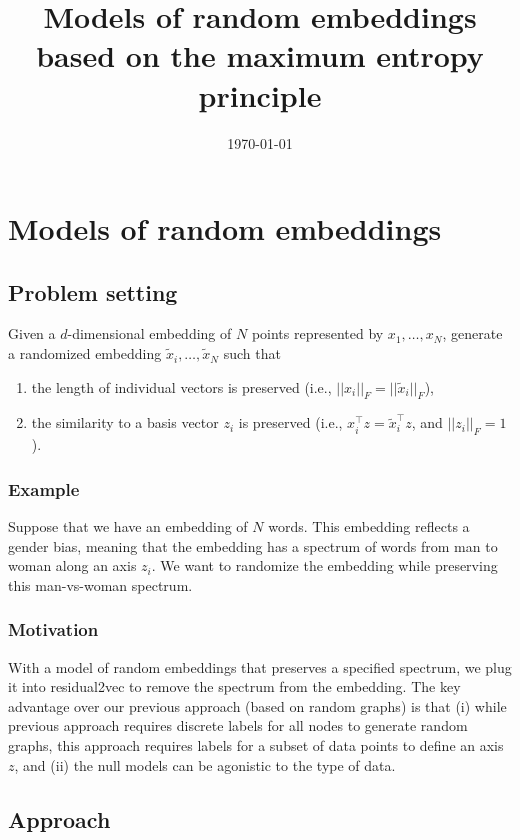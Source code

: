 \documentclass[12pt]{article} %
\begin{document}

\title{Models of random embeddings based on the maximum entropy principle} %
\date{\today}
\maketitle %

\section{Models of random embeddings}
\subsection{Problem setting}

Given a $d$-dimensional embedding of $N$ points represented by $x_1, \ldots, x_N$, generate a randomized embedding $\tilde x_i, \ldots, \tilde x_N$ such that
\begin{enumerate}
\item the length of individual vectors is preserved (i.e., $||x_i||_F = ||\tilde x_i||_F$),
\item the similarity to a basis vector $z_i$ is preserved (i.e., $x_i ^\top z = \tilde x_i ^\top z$, and $||z_i||_F = 1$).
\end{enumerate}

\subsubsection*{Example}
Suppose that we have an embedding of $N$ words. This embedding reflects a gender bias, meaning that the embedding has a spectrum of words from man to woman along an axis $z_i$. We want to randomize the embedding while preserving this man-vs-woman spectrum.

\subsubsection*{Motivation}
With a model of random embeddings that preserves a specified spectrum, we plug it into residual2vec to remove the spectrum from the embedding. The key advantage over our previous approach (based on random graphs) is that (i) while previous approach requires discrete labels for all nodes to generate random graphs, this approach requires labels for a subset of data points to define an axis $z$, and (ii) the null models can be agonistic to the type of data.

\subsection{Approach}
\end{document}
